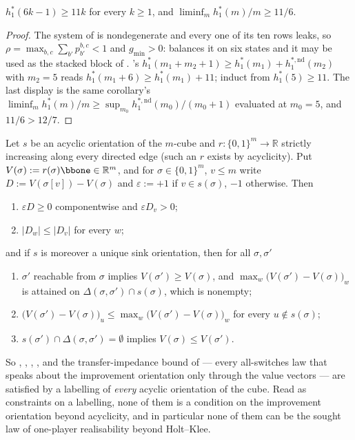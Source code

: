 \begin{corollary}\label{oc:slope}
$h^{\ast}_{1}(6k-1)\ge11k$ for every $k\ge1$, and
$\liminf_{m}h^{\ast}_{1}(m)/m\ge11/6$.
\end{corollary}

\begin{proof}
The system of  is nondegenerate and every one of
its ten rows leaks, so $\rho=\max_{b,c}\sum_{b'}p^{b,c}_{b'}<1$ and
$g_{\min}>0$:  balances it on six states and it may be used
as the stacked block of . 's
$h^{\ast}_{1}(m_1+m_2+1)\ge h^{\ast}_{1}(m_1)+h^{\ast,\mathrm{nd}}_{1}(m_2)$
with $m_2=5$ reads $h^{\ast}_{1}(m_1+6)\ge h^{\ast}_{1}(m_1)+11$; induct from
$h^{\ast}_{1}(5)\ge11$. The last display is the same corollary's
$\liminf_m h^{\ast}_{1}(m)/m\ge\sup_{m_0}h^{\ast,\mathrm{nd}}_{1}(m_0)/(m_0+1)$
evaluated at $m_0=5$, and $11/6>12/7$.
\end{proof}

\begin{theorem}
\label{oc:diagonal}
Let $s$ be an acyclic orientation of the $m$-cube and $r:\{0,1\}^{m}\to\mathbb R$
strictly increasing along every directed edge (such an $r$ exists by
acyclicity). Put $V(\sigma):=r(\sigma)\bbone\in\mathbb R^{m}$, and for
$\sigma\in\{0,1\}^{m}$, $v\le m$ write $D:=V(\sigma[v])-V(\sigma)$ and
$\varepsilon:=+1$ if $v\in s(\sigma)$, $-1$ otherwise. Then
\begin{enumerate}[label=(\alph*),leftmargin=2.2em]
\item $\varepsilon D\ge0$ componentwise and $\varepsilon D_v>0$;
\item $|D_w|\le|D_v|$ for every $w$;
\end{enumerate}
and if $s$ is moreover a unique sink orientation, then for all $\sigma,\sigma'$
\begin{enumerate}[label=(\alph*),leftmargin=2.2em,start=3]
\item $\sigma'$ reachable from $\sigma$ implies $V(\sigma')\ge V(\sigma)$, and
      $\max_w\bigl(V(\sigma')-V(\sigma)\bigr)_w$ is attained on
      $\Delta(\sigma,\sigma')\cap s(\sigma)$, which is nonempty;
\item $\bigl(V(\sigma')-V(\sigma)\bigr)_u\le\max_w\bigl(V(\sigma')-V(\sigma)\bigr)_w$
      for every $u\notin s(\sigma)$;
\item $s(\sigma')\cap\Delta(\sigma,\sigma')=\emptyset$ implies
      $V(\sigma)\le V(\sigma')$.
\end{enumerate}
So , , ,
,  and the transfer-impedance bound
of  --- every all-switches law that speaks about the
improvement orientation only through the value vectors --- are satisfied by a
labelling of \emph{every} acyclic orientation of the cube. Read as constraints
on a labelling, none of them is a condition on the improvement orientation
beyond acyclicity, and in particular none of them can be the sought law of
one-player realisability beyond Holt--Klee.
\end{theorem}

